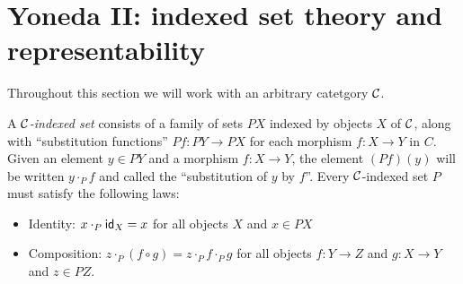 

\chapter{Yoneda II: indexed set theory and representability}

Throughout this section we will work with an arbitrary catetgory \(\mathcal C\).

\begin{definition}
  A \emph{\(\mathcal C\)-indexed set}
  consists of a family of sets \(PX\) indexed by objects \(X\) of \(\mathcal C\),
  along with ``substitution functions'' \(Pf : PY \to PX\)
  for each morphism \(f : X \to Y\) in \(C\).
  Given an element \(y \in PY\)
  and a morphism \(f : X \to Y\),
  the element \((Pf)(y)\) will be written \(y \cdot_P f\)
  and called the ``substitution of \(y\) by \(f\)''.
  Every \(\mathcal C\)-indexed set \(P\)
  must satisfy the following laws:
  \begin{itemize}
  \item Identity: \(x \cdot_P \mathsf{id}_X = x\) for all objects \(X\) and \(x \in PX\)
  \item Composition: \(z \cdot_P (f\circ g) = z \cdot_P f \cdot_P g\)
    for all objects \(f : Y \to Z\) and \(g : X \to Y\) and \(z \in PZ\).
  \end{itemize}
\end{definition}

